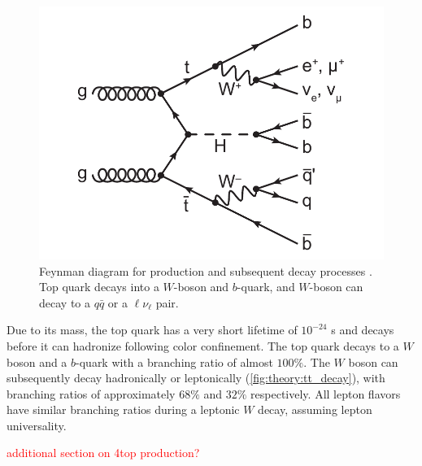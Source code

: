 \documentclass[../thesis.tex]{subfiles}
\begin{document}
\begin{figure}
\begin{center}
\includegraphics[width=\linewidth]{fig/theory_tt_decay.pdf}
\caption[Feynman diagram for \ttbar production and subsequent decay processes. Top quark decays into a $W$-boson and $b$-quark, and $W$-boson can decay to a $q\bar{q}$ or a $\ell\nu_\ell$ pair.]{\label{fig:theory:tt_decay}Feynman diagram for \ttbar production and subsequent decay processes \citep{theory:ttH_Hbb}. Top quark decays into a $W$-boson and $b$-quark, and $W$-boson can decay to a $q\bar{q}$ or a $\ell\nu_\ell$ pair.}
\end{center}
\end{figure}

Due to its mass, the top quark has a very short lifetime of $10^{-24}$ s \citep{PDG} and decays before it can hadronize following color confinement. The top quark decays to a $W$ boson and a $b$-quark with a branching ratio of almost $100\%$. The $W$ boson can subsequently decay hadronically or leptonically (\autoref{fig:theory:tt_decay}), with branching ratios of approximately $68\%$ and $32\%$ respectively. All lepton flavors have similar branching ratios during a leptonic $W$ decay, assuming lepton universality.

\textcolor{red}{additional section on 4top production?}
\end{document}
